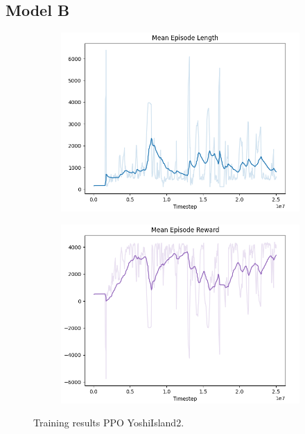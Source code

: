 \documentclass[a4paper]{article}
\begin{document}
\subsection{Model B}
\begin{figure}[htbp]
    \centering
    \begin{subfigure}{.5\textwidth}
        \centering
        \includegraphics[width=\textwidth]{PPO_YoshiIsland2_len}
        \label{fig:result2:sub1}
    \end{subfigure}%
    \begin{subfigure}{.5\textwidth}
        \centering
        \includegraphics[width=\textwidth]{PPO_YoshiIsland2_rew}
        \label{fig:result2:sub2}
    \end{subfigure}
    \caption{Training results PPO YoshiIsland2.}
    \label{fig:result2}
\end{figure}

\begingroup
\setlength{\emergencystretch}{1em}
\printbibliography
\endgroup
\end{document}
